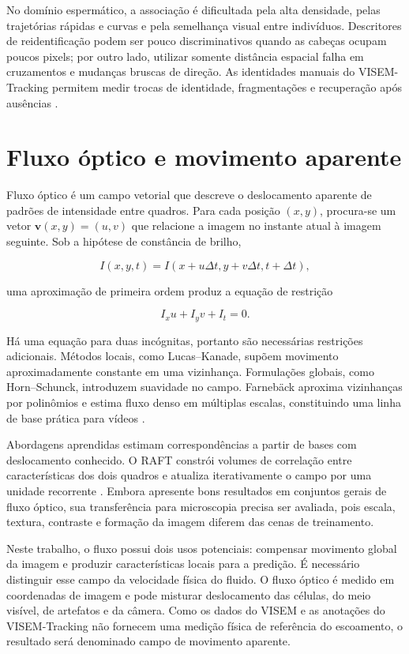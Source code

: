 No domínio espermático, a associação é dificultada pela alta densidade, pelas trajetórias rápidas e curvas e pela semelhança visual entre indivíduos. Descritores de reidentificação podem ser pouco discriminativos quando as cabeças ocupam poucos pixels; por outro lado, utilizar somente distância espacial falha em cruzamentos e mudanças bruscas de direção. As identidades manuais do VISEM-Tracking permitem medir trocas de identidade, fragmentações e recuperação após ausências \cite{thambawita2023visemtracking}.

\section{Fluxo óptico e movimento aparente}

Fluxo óptico é um campo vetorial que descreve o deslocamento aparente de padrões de intensidade entre quadros. Para cada posição $(x,y)$, procura-se um vetor $\mathbf{v}(x,y)=(u,v)$ que relacione a imagem no instante atual à imagem seguinte. Sob a hipótese de constância de brilho,

\begin{equation}
	I(x,y,t)=I(x+u\Delta t,y+v\Delta t,t+\Delta t),
\end{equation}

uma aproximação de primeira ordem produz a equação de restrição

\begin{equation}
	I_xu+I_yv+I_t=0.
\end{equation}

Há uma equação para duas incógnitas, portanto são necessárias restrições adicionais. Métodos locais, como Lucas--Kanade, supõem movimento aproximadamente constante em uma vizinhança. Formulações globais, como Horn--Schunck, introduzem suavidade no campo. Farnebäck aproxima vizinhanças por polinômios e estima fluxo denso em múltiplas escalas, constituindo uma linha de base prática para vídeos \cite{farneback2003twoframe,szeliski2022computer}.

Abordagens aprendidas estimam correspondências a partir de bases com deslocamento conhecido. O RAFT constrói volumes de correlação entre características dos dois quadros e atualiza iterativamente o campo por uma unidade recorrente \cite{teed2020raft}. Embora apresente bons resultados em conjuntos gerais de fluxo óptico, sua transferência para microscopia precisa ser avaliada, pois escala, textura, contraste e formação da imagem diferem das cenas de treinamento.

Neste trabalho, o fluxo possui dois usos potenciais: compensar movimento global da imagem e produzir características locais para a predição. É necessário distinguir esse campo da velocidade física do fluido. O fluxo óptico é medido em coordenadas de imagem e pode misturar deslocamento das células, do meio visível, de artefatos e da câmera. Como os dados do VISEM e as anotações do VISEM-Tracking não fornecem uma medição física de referência do escoamento, o resultado será denominado campo de movimento aparente.

